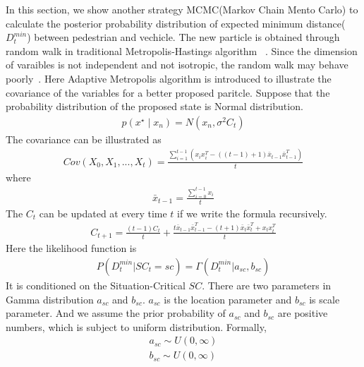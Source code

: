 \documentclass[10pt,twocolumn,letterpaper]{article}
\begin{document}
    In this section, we show another strategy MCMC(Markov Chain Mento Carlo) to calculate the posterior probability
    distribution of expected minimum distance($D_t^{min}$) between pedestrian and vechicle. 
    The new particle is obtained through random walk in traditional Metropolis-Hastings algorithm
    ~\cite{IEEEhowto:mh}. Since
    the dimension of varaibles is not independent and not isotropic, the random walk may 
    behave poorly~\cite{IEEEhowto:sunyasheng}. Here Adaptive Metropolis algorithm is introduced to 
    illustrate the covariance of the variables for a better proposed paritcle. Suppose that 
    the probability distribution of the proposed state is Normal distribution. 
    \begin{eqnarray*}
        p(x^\star \mid x_n) = N(x_n, \sigma^2 C_t)
    \end{eqnarray*} 
    The covariance can be illustrated as
    \begin{eqnarray*}
        Cov(X_0, X_1, ... , X_t) = \frac{\sum_{i=1}^{t-1}(x_ix_i^{T} - ((t-1)+1)\bar x_{t-1}\bar x_{t-1}^T)}{t}        
    \end{eqnarray*}
    where
    \begin{eqnarray*}
        \bar x_{t-1} = \frac{\sum_{i=0}^{t-1} x_i}{t}
    \end{eqnarray*}
    The $C_t$ can be updated at every time $t$ if we write the formula recursively.
    \begin{eqnarray*}
        C_{t+1} = \frac{(t-1)C_t}{t} + \frac{t\bar x_{t-1} \bar x_{t-1}^T - (t+1)\bar x_t \bar x_t ^T + x_t x_t^T}{t}
    \end{eqnarray*}
    Here the likelihood function is   
    \begin{eqnarray*}
        P(D_t^{min}|SC_t = sc) = \Gamma(D_t^{min}|a_{sc}, b_{sc})    
    \end{eqnarray*}
    It is conditioned on the Situation-Critical $SC$. There are two parameters in Gamma distribution $a_{sc}$ and $b_{sc}$.
    $a_{sc}$ is the location parameter and $b_{sc}$ is scale parameter. And we assume the prior probability of $a_{sc}$ 
    and $b_{sc}$ are positive numbers, which is subject to uniform distribution. Formally,
    \begin{eqnarray*}
        a_{sc} \sim U(0,\infty)\\
        b_{sc} \sim U(0,\infty)
    \end{eqnarray*}
\end{document}
